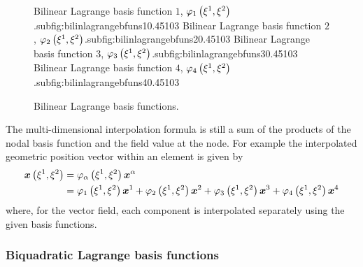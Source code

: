 \begin{figure}[hbtp]
   \centering
     {Bilinear Lagrange basis function $1$, $   \varphi_{1} \left( \xi^{1},\xi^{2} \right)  $.}{subfig:bilinlagrangebfuns1}{0.45\linewidth}{10}{3}{}
   \hfil
     {Bilinear Lagrange basis function $2$, $   \varphi_{2} \left( \xi^{1},\xi^{2} \right)  $.}{subfig:bilinlagrangebfuns2}{0.45\linewidth}{10}{3}{}
     {Bilinear Lagrange basis function $3$, $   \varphi_{3} \left( \xi^{1},\xi^{2} \right)  $.}{subfig:bilinlagrangebfuns3}{0.45\linewidth}{10}{3}{}
   \hfil  
     {Bilinear Lagrange basis function $4$, $   \varphi_{4} \left( \xi^{1},\xi^{2} \right)  $.}{subfig:bilinlagrangebfuns4}{0.45\linewidth}{10}{3}{}
   \caption[Bilinear Lagrange basis functions.]{Bilinear Lagrange basis functions.}
   \label{fig:bilinlagrangebfuns}
\end{figure}
            
The multi-dimensional interpolation formula is still a sum of the products of
the nodal basis function and the field value at the node. For example the
interpolated geometric position vector within an element is given by
\begin{equation}
  \begin{split}
    \fnof{\vect{x}}{\xione,\xitwo}&=\lbfn{\alpha}{\xione,\xitwo}
    \nodept{\vect{x}}{\alpha}\\
    &=\lbfn{1}{\xione,\xitwo}\nodept{\vect{x}}{1}+\lbfn{2}{\xione,\xitwo}
    \nodept{\vect{x}}{2}+\lbfn{3}{\xione,\xitwo}\nodept{\vect{x}}{3}+
    \lbfn{4}{\xione,\xitwo}\nodept{\vect{x}}{4}
  \end{split}
\end{equation}
where, for the vector field, each component is interpolated separately using
the given basis functions.

\subsubsection{Biquadratic Lagrange basis functions}

